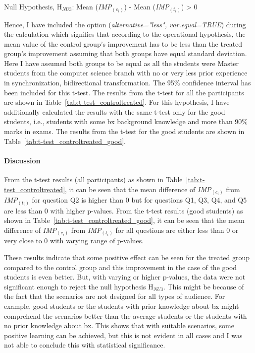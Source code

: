 Null Hypothesis, {H$_{NU3}$}: Mean (\textit{IMP$_{(c_i)}$}) - Mean (\textit{IMP$_{(t_i)}$}) > 0

Hence, I have included the option (\textit{alternative="less", var.equal=TRUE}) during the calculation which signifies that according to the operational hypothesis, the mean value of the control group's improvement has to be less than the treated group's improvement assuming that both groups have equal standard deviation. Here I have assumed both groups to be equal as all the students were Master students from the computer science branch with no or very less prior experience in synchronization, bidirectional transformation. The 95\% confidence interval has been included for this t-test. The results from the t-test for all the participants are shown in Table~\ref{tab:t-test_controltreated}. For this hypothesis, I have additionally calculated the results with the same t-test only for the good students, i.e., students with some bx background knowledge and more than 90\% marks in exams. The results from the t-test for the good students are shown in Table~\ref{tab:t-test_controltreated_good}.

\paragraph{Discussion}
From the t-test results (all participants) as shown in Table~\ref{tab:t-test_controltreated}, it can be seen that the mean difference of \textit{IMP$_{(c_i)}$} from \textit{IMP$_{(t_i)}$} for question Q2 is higher than 0 but for questions Q1, Q3, Q4, and Q5 are less than 0 with higher p-values. From the t-test results (good students) as shown in Table~\ref{tab:t-test_controltreated_good}, it can be seen that the mean difference of \textit{IMP$_{(c_i)}$} from \textit{IMP$_{(t_i)}$} for all questions are either less than 0 or very close to 0 with varying range of p-values.

These results indicate that some positive effect can be seen for the treated group compared to the control group and this improvement in the case of the good students is even better. But, with varying or higher p-values, the data were not significant enough to reject the null hypothesis {H$_{NU3}$}. This might be because of the fact that the scenarios are not designed for all types of audience. For example, good students or the students with prior knowledge about bx might comprehend the scenarios better than the average students or the students with no prior knowledge about bx. This shows that with suitable scenarios, some positive learning can be achieved, but this is not evident in all cases and I was not able to conclude this with statistical significance.

